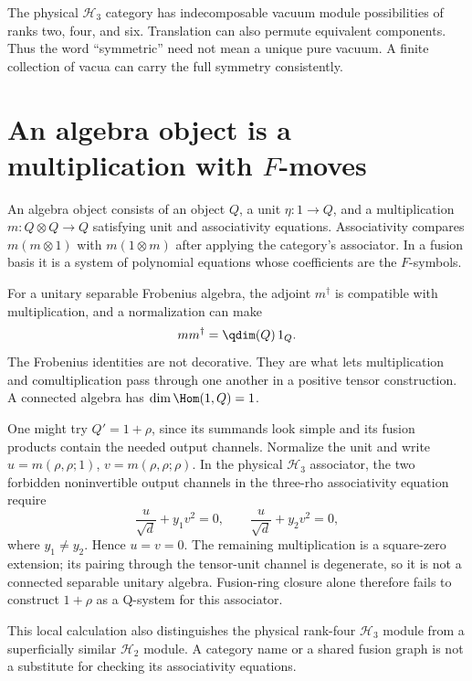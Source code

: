 The physical $\mathcal H_3$ category has indecomposable vacuum module possibilities
of ranks two, four, and six. Translation can also permute equivalent
components. Thus the word ``symmetric'' need not mean a unique pure
vacuum. A finite collection of vacua can carry the full symmetry
consistently.

\section{An algebra object is a multiplication with \texorpdfstring{$F$}{F}-moves}

An algebra object consists of an object $Q$, a unit
$\eta:1\to Q$, and a multiplication $m:Q\otimes Q\to Q$ satisfying
unit and associativity equations. Associativity compares
$m(m\otimes1)$ with $m(1\otimes m)$ after applying the category's
associator. In a fusion basis it is a system of polynomial equations
whose coefficients are the $F$-symbols.

For a unitary separable Frobenius algebra, the adjoint $m^\dagger$
is compatible with multiplication, and a normalization can make
\[
 mm^\dagger=\qdim(Q)\,1_Q.
\]
The Frobenius identities are not decorative. They are what lets
multiplication and comultiplication pass through one another in a
positive tensor construction. A connected algebra has
$\dim\Hom(1,Q)=1$.

\begin{example}
One might try $Q'=1+\rho$, since its summands look simple and its
fusion products contain the needed output channels. Normalize the
unit and write
$u=m(\rho,\rho;1)$, $v=m(\rho,\rho;\rho)$. In the physical $\mathcal H_3$
associator, the two forbidden noninvertible output channels in the
three-rho associativity equation require
\[
 \frac u{\sqrt d}+y_1v^2=0,\qquad
 \frac u{\sqrt d}+y_2v^2=0,
\]
where $y_1\ne y_2$. Hence $u=v=0$. The remaining multiplication is
a square-zero extension; its pairing through the tensor-unit channel
is degenerate, so it is not a connected separable unitary algebra.
Fusion-ring closure alone therefore fails to construct $1+\rho$ as
a Q-system for this associator.
\end{example}

This local calculation also distinguishes the physical rank-four
$\mathcal H_3$ module from a superficially similar $\mathcal H_2$ module. A category name
or a shared fusion graph is not a substitute for checking its
associativity equations.

